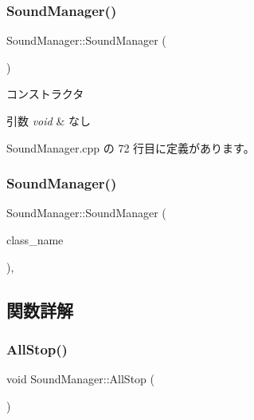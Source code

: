 \subsubsection{\texorpdfstring{Sound\+Manager()}{SoundManager()}\hspace{0.1cm}{\footnotesize\ttfamily [1/2]}}
{\footnotesize\ttfamily Sound\+Manager\+::\+Sound\+Manager (\begin{DoxyParamCaption}{ }\end{DoxyParamCaption})\hspace{0.3cm}{\ttfamily [private]}}



コンストラクタ 


\begin{DoxyParams}{引数}
{\em void} & なし \\
\hline
\end{DoxyParams}


 Sound\+Manager.\+cpp の 72 行目に定義があります。

\mbox{\label{class_sound_manager_a64d6b47ad5f72114d2cae83b2ef7b350}} 
\subsubsection{\texorpdfstring{Sound\+Manager()}{SoundManager()}\hspace{0.1cm}{\footnotesize\ttfamily [2/2]}}
{\footnotesize\ttfamily Sound\+Manager\+::\+Sound\+Manager (\begin{DoxyParamCaption}\item[{const \mbox{\hyperlink{class_sound_manager}{Sound\+Manager}} \&}]{class\+\_\+name }\end{DoxyParamCaption})\hspace{0.3cm}{\ttfamily [private]}, {\ttfamily [delete]}}



\subsection{関数詳解}
\mbox{\label{class_sound_manager_a59093ea4593b0f9036f976db929aecb1}} 
\subsubsection{\texorpdfstring{All\+Stop()}{AllStop()}}
{\footnotesize\ttfamily void Sound\+Manager\+::\+All\+Stop (\begin{DoxyParamCaption}{ }\end{DoxyParamCaption})}



